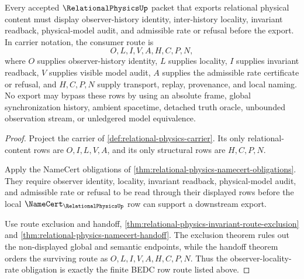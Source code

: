 \begin{theorem}
\label{thm:relational-physics-observer-locality-rate-obligation}
Every accepted $\RelationalPhysicsUp$ packet that exports relational physical content must display observer-history identity, inter-history locality, invariant readback, physical-model audit, and admissible rate or refusal before the export. In carrier notation, the consumer route is
$$
O,L,I,V,A,H,C,P,N,
$$
where $O$ supplies observer-history identity, $L$ supplies locality, $I$ supplies invariant readback, $V$ supplies visible model audit, $A$ supplies the admissible rate certificate or refusal, and $H,C,P,N$ supply transport, replay, provenance, and local naming. No export may bypass these rows by using an absolute frame, global synchronization history, ambient spacetime, detached truth oracle, unbounded observation stream, or unledgered model equivalence.
\end{theorem}
\begin{proof}
Project the carrier of \autoref{def:relational-physics-carrier}. Its only relational-content rows are $O,I,L,V,A$, and its only structural rows are $H,C,P,N$.

Apply the NameCert obligations of \autoref{thm:relational-physics-namecert-obligations}. They require observer identity, locality, invariant readback, physical-model audit, and admissible rate or refusal to be read through their displayed rows before the local $\NameCert_{\RelationalPhysicsUp}$ row can support a downstream export.

Use route exclusion and handoff, \autoref{thm:relational-physics-invariant-route-exclusion} and \autoref{thm:relational-physics-namecert-handoff}. The exclusion theorem rules out the non-displayed global and semantic endpoints, while the handoff theorem orders the surviving route as $O,L,I,V,A,H,C,P,N$. Thus the observer-locality-rate obligation is exactly the finite BEDC row route listed above.
\end{proof}

